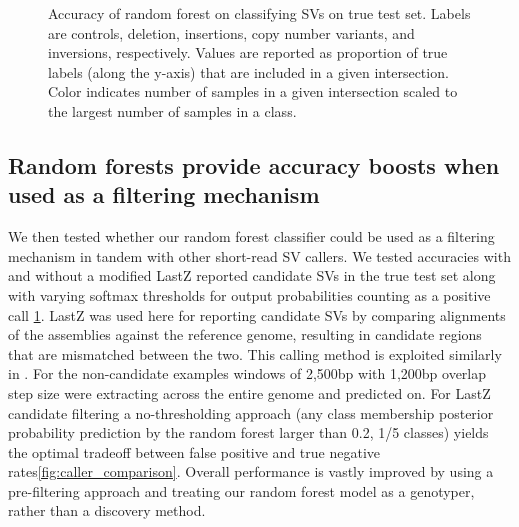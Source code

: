 \begin{figure}
    \centering
    \caption[Accuracy of random forest on classifying SVs on true test set.]{Accuracy of random forest on classifying SVs on true test set. Labels are controls, deletion, insertions, copy number variants, and inversions, respectively. Values are reported as proportion of true labels (along the y-axis) that are included in a given intersection. Color indicates number of samples in a given intersection scaled to the largest number of samples in a class.}
    \label{fig:test_accuracy_forest}
\end{figure}


\subsection{Random forests provide accuracy boosts when used as a filtering mechanism}

We then tested whether our random forest classifier could be used as a filtering mechanism in tandem with other short-read SV callers. We tested accuracies with and without a modified LastZ \cite{chakrabortyStructuralVariantsExhibit2019} reported candidate SVs in the true test set along with varying softmax thresholds for output probabilities counting as a positive call \ref{fig:test_accuracy_forest}. LastZ was used here for reporting candidate SVs by comparing alignments of the assemblies against the reference genome, resulting in candidate regions that are mismatched between the two. This calling method is exploited similarly in \cite{chakrabortyEvolutionGenomeStructure2021}. For the non-candidate examples windows of 2,500bp with 1,200bp overlap step size were extracting across the entire genome and predicted on. For LastZ candidate filtering a no-thresholding approach (any class membership posterior probability prediction by the random forest larger than 0.2, 1/5 classes) yields the optimal tradeoff between false positive and true negative rates\ref{fig:caller_comparison}. Overall performance is vastly improved by using a pre-filtering approach and treating our random forest model as a genotyper, rather than a discovery method.

